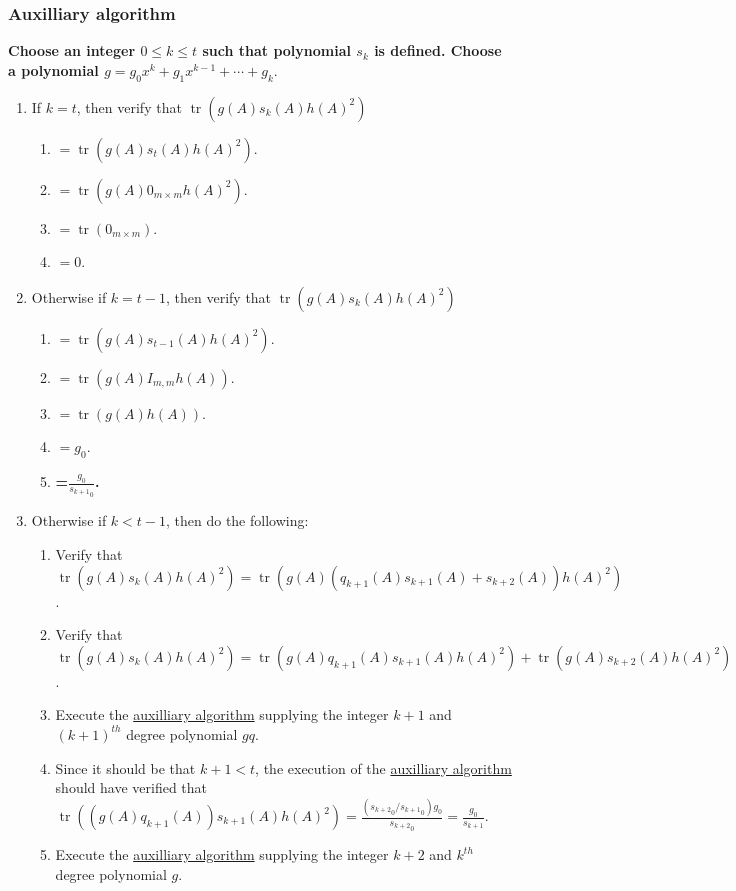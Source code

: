 \documentclass[twocolumn]{article}
\DeclareMathOperator{\tr}{tr}
\begin{document}
			\subsubsection{Auxilliary algorithm}\label{sec:algorithm 46 auxilliary algorithm}
				\textbf{Choose an integer $0\le k\le t$ such that polynomial $s_k$ is defined. Choose a polynomial $g=g_0x^k+g_1x^{k-1}+\cdots+g_k.$}
				\begin{enumerate}
					\item If $k=t$, then verify that $\tr(g(A)s_k(A)h(A)^2)$
					\begin{enumerate}
						\item $=\tr(g(A)s_t(A)h(A)^2)$.
						\item $=\tr(g(A)0_{m\times m}h(A)^2)$.
						\item $=\tr(0_{m\times m})$.
						\item $=0$.
					\end{enumerate}
					\item Otherwise if $k=t-1$, then verify that $\tr(g(A)s_k(A)h(A)^2)$
					\begin{enumerate}
						\item $=\tr(g(A)s_{t-1}(A)h(A)^2)$.
						\item $=\tr(g(A)I_{m,m}h(A))$.
						\item $=\tr(g(A)h(A))$.
						\item $=g_0$.
						\item \textbf{=$\frac{g_0}{{s_{k+1}}_0}$.}
					\end{enumerate}
					\item Otherwise if $k<t-1$, then do the following:
					\begin{enumerate}
						\item Verify that $\tr(g(A)s_k(A)h(A)^2)=\tr(g(A)(q_{k+1}(A)s_{k+1}(A)+s_{k+2}(A))h(A)^2)$.
						\item Verify that $\tr(g(A)s_k(A)h(A)^2)=\tr(g(A)q_{k+1}(A)s_{k+1}(A)h(A)^2)+\tr(g(A)s_{k+2}(A)h(A)^2)$.
						\item Execute the \hyperref[sec:algorithm 46 auxilliary algorithm]{auxilliary algorithm} supplying the integer $k+1$ and $(k+1)^{th}$ degree polynomial $gq$.
						\item Since it should be that $k+1<t$, the execution of the \hyperref[sec:algorithm 46 auxilliary algorithm]{auxilliary algorithm} should have verified that $\tr((g(A)q_{k+1}(A))s_{k+1}(A)h(A)^2)=\frac{({s_{k+2}}_0/{s_{k+1}}_0)g_0}{{s_{k+2}}_0}=\frac{g_0}{s_{k+1}}$.
						\item Execute the \hyperref[sec:algorithm 46 auxilliary algorithm]{auxilliary algorithm} supplying the integer $k+2$ and $k^{th}$ degree polynomial $g$.

\end{enumerate}
\end{enumerate}
\end{document}
